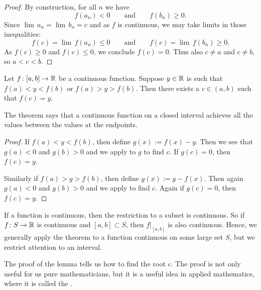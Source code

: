 \begin{proof}
By construction, for all $n$ we have
\begin{equation*}
f(a_n) < 0
\qquad \text{and} \qquad
f(b_n) \geq 0 .
\end{equation*}
Since
$\lim\, a_n = \lim\, b_n = c$
and as $f$ is continuous, we may take 
limits in those inequalities:
\begin{equation*}
f(c) = \lim\, f(a_n) \leq 0
\qquad \text{and} \qquad
f(c) = \lim\, f(b_n) \geq 0 .
\end{equation*}
As $f(c) \geq 0$ and 
$f(c) \leq 0$, we conclude $f(c) = 0$.
Thus also $c \not=a$ and $c \not= b$, so
$a < c < b$.
\end{proof}

\begin{thm} \label{IVT:thm}
Let $f \colon [a,b] \to {\mathbb{R}}$ be a continuous function.
Suppose $y \in {\mathbb{R}}$ is such that $f(a) < y < f(b)$
or $f(a) > y > f(b)$.  Then there exists a $c \in (a,b)$
such that $f(c) = y$.
\end{thm}

The theorem says that a continuous function on a closed interval
achieves all the values between the values at the endpoints.

\begin{proof}
If $f(a) < y < f(b)$, then define $g(x) := f(x)-y$.  Then we see
that $g(a) < 0$ and $g(b) > 0$ and we apply 
to $g$ to find $c$.  If $g(c) = 0$, then $f(c) = y$.

Similarly if $f(a) > y > f(b)$, then define $g(x) := y-f(x)$.  Then
again $g(a) < 0$ and $g(b) > 0$ and we apply  to
find $c$.
Again if $g(c) = 0$, then $f(c) = y$.
\end{proof}

If a function is continuous, then the restriction
to a subset is continuous.  So if $f \colon S \to {\mathbb{R}}$ is continuous and
$[a,b] \subset S$, then $f|_{[a,b]}$ is also continuous.  Hence, we generally
apply the theorem to a function continuous on some large set $S$,
but we restrict attention to an interval.


The proof of the lemma tells us how to find the root $c$.  The
proof is not only useful for us pure mathematicians,
but it is a useful idea in applied mathematics,
where it is called the \emph{}.


